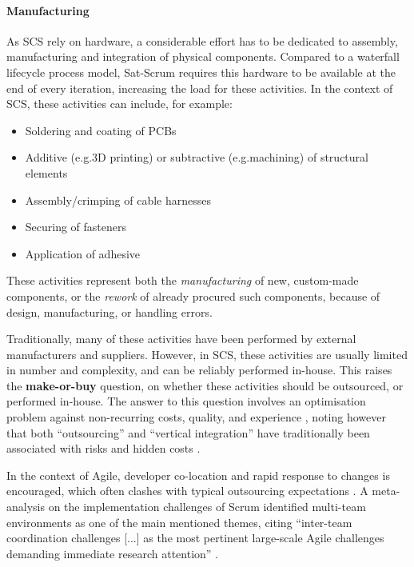 \documentclass[a4paper,nobib,justified,final]{tufte-book}
\begin{document}
\paragraph{Manufacturing}
\label{sec:METHODOLOGY_manufacturing}

As \acl{SCS} rely on hardware, a considerable effort has to be dedicated to assembly, manufacturing and integration of physical components. Compared to a waterfall lifecycle process model, Sat-Scrum requires this hardware to be available at the end of every iteration, increasing the load for these activities. In the context of \acs{SCS}, these activities can include, for example:
\begin{itemize}[itemsep=-2ex]
	\item Soldering and coating of \acsp{PCB}
	\item Additive (e.g.\@3D printing) or subtractive (e.g.\@ machining) of structural elements
	\item Assembly/crimping of cable harnesses
	\item Securing of fasteners
	\item Application of adhesive
\end{itemize}
These activities represent both the \emph{manufacturing} of new, custom-made components, or the \emph{rework} of already procured such components, because of design, manufacturing, or handling errors.

Traditionally, many of these activities have been performed by external manufacturers and suppliers. However, in \acs{SCS}, these activities are usually limited in number and complexity, and can be reliably performed in-house. This raises the \textbf{make-or-buy} question, on whether these activities should be outsourced, or performed in-house. The answer to this question involves an optimisation problem against non-recurring costs, quality, and experience \autocite{medina-serranoStrategicSourcingDeveloping2020}, noting however that both ``outsourcing'' and ``vertical integration'' have traditionally been associated with risks and hidden costs \autocite{hilmerStrategicOutsourcing1994,barthelemyHiddenCostsIT2001}.

In the context of Agile, developer co-location and rapid response to changes is encouraged, which often clashes with typical outsourcing expectations \autocite{durmicAdoptingAgileScrum2024}. A \citeyear{lemmaSystematicLiteratureReview2025} meta-analysis on the implementation challenges of Scrum identified multi-team environments as one of the main mentioned themes, citing ``inter-team coordination challenges [...] as the most pertinent large-scale Agile challenges demanding immediate research attention'' \autocite{lemmaSystematicLiteratureReview2025,moeTrendsLargeScaleAgile2016}.
\end{document}
